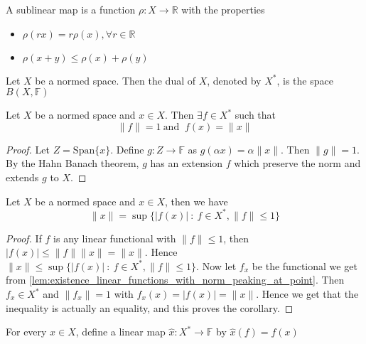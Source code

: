 
\begin{definition}
  A sublinear map is a function $\rho: X \to \mathbb{R}$ with the properties
  \begin{itemize}[]
    \item $\rho(rx) = r \rho(x), \forall r \in \mathbb{R}$
    \item $\rho(x+y) \le \rho(x)+\rho(y)$
  \end{itemize}
\end{definition}

\begin{definition}
  Let $X$ be a normed space. Then the dual of $X$, denoted by $
  X^{*}$, is the space $B(X, \mathbb{F})$
\end{definition}

\begin{lemma}
  \label{lem:existence_linear_functions_with_norm_peaking_at_point}
  Let $X$ be a normed space and $x \in X$. Then $\exists f \in X^{*}$
  such that \[
    \|f\| = 1 \ \textrm{and } \ f(x) = \|x\|
  \]
\end{lemma}
\begin{proof}
  Let $Z = \textrm{Span}\{ x \}$. Define $g: Z \to \mathbb{F}$ as
  $g(\alpha  x) = \alpha \|x\|$. Then $\|g\| = 1$. By the Hahn Banach
  theorem, $g$ has an extension $f$ which preserve the norm and
  extends $g$ to $X$.
\end{proof}

\begin{corollary}
  \label{cor:dual_maps_norm_elements}
  Let $X$ be a normed space and $x \in X$, then we have \[
    \|x\| = \sup \{ |f(x)| \ : \ f \in X^{*}, \|f\| \le 1 \}
  \]
\end{corollary}
\begin{proof}
  If $f$ is any linear functional with $\|f\| \le 1$, then $|f(x)|
  \le \|f\|\|x\| = \|x\|$. Hence $\|x\| \le \sup \{ |f(x)| \ : \ f
  \in X^{*}, \|f\| \le 1 \}$.
  Now let $f_x$ be the functional we get from
  \autoref{lem:existence_linear_functions_with_norm_peaking_at_point}.
  Then $f_x \in X^{*}$ and $\|f_x\| = 1$ with $f_x(x) = |f(x)| =
  \|x\|$. Hence we get that the inequality is actually an equality,
  and this proves the corollary.
\end{proof}

\begin{definition}
  For every $x \in X$, define a linear map $\hat{x}: X^{*} \to
  \mathbb{F}$ by $\hat{x}(f) = f(x)$
\end{definition}


